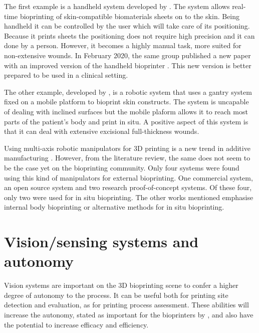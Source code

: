 The first example is a handheld system developed by \citeauthor{Hakimi2018_handheld_skin_printer}\cite{Hakimi2018_handheld_skin_printer}. The system allows real-time bioprinting of skin-compatible biomaterials sheets on to the skin. Being handheld it can be controlled by the user which will take care of its positioning. Because it prints sheets the positioning does not require high precision and it can done by a person. However, it becomes a highly manual task, more suited for non-extensive wounds. In February 2020, the same group published a new paper with an improved version of the handheld bioprinter \cite{Cheng2020_handheld_skin_bioprinter}. This new version is better prepared to be used in a clinical setting.

The other example, developed by \citeauthor{Albanna2019_in_situ_bioprinting_mobile_gantry}\cite{Albanna2019_in_situ_bioprinting_mobile_gantry}, is a robotic system that uses a gantry system fixed on a mobile platform to bioprint skin constructs. The system is uncapable of dealing with inclined surfaces but the mobile plaform allows it to reach most parts of the patient's body and print in situ. A positive aspect of this system is that it can deal with extensive excisional full-thickness wounds.\bigskip

Using multi-axis robotic manipulators for 3D printing is a new trend in additive manufacturing \cite{Urhal2019_robot_assisted_additive_manufacturing_review}. However, from the literature review, the same does not seem to be the case yet on the bioprinting community. Only four systems were found using this kind of manipulators for external bioprinting. One commercial system, an open source system and two research proof-of-concept systems. Of these four, only two were used for in situ bioprinting. The other works mentioned emphasise internal body bioprinting or alternative methods for in situ bioprinting.


\section{Vision/sensing systems and autonomy}
\label{sec:vision_sensing_systems_and_autonomy}

Vision systems are important on the 3D bioprinting scene to confer a higher degree of autonomy to the process. It can be useful both for printing site detection and evaluation, as for printing process assessment. These abilities will increase the autonomy, stated as important for the bioprinters by \citeauthor{Ozbolat2017_evaluation_bioprinter_tech}\cite{Ozbolat2017_evaluation_bioprinter_tech}, and also have the potential to increase efficacy and efficiency.\bigskip

